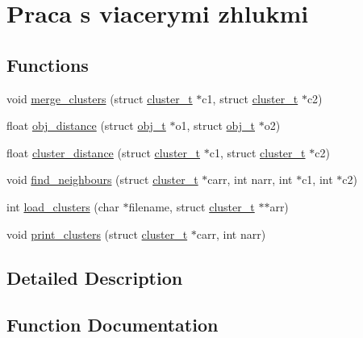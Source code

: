 \hypertarget{group__clusts}{}\section{Praca s viacerymi zhlukmi}
\label{group__clusts}
\subsection*{Functions}
\begin{DoxyCompactItemize}
\item 
void \hyperlink{group__clusts_gac39a25fdec1f4952ec92ee5407893158}{merge\+\_\+clusters} (struct \hyperlink{structcluster__t}{cluster\+\_\+t} $\ast$c1, struct \hyperlink{structcluster__t}{cluster\+\_\+t} $\ast$c2)
\end{DoxyCompactItemize}
\begin{DoxyCompactItemize}
\item 
float \hyperlink{group__clusts_ga703ce6afddf65026b68645bc5394405b}{obj\+\_\+distance} (struct \hyperlink{structobj__t}{obj\+\_\+t} $\ast$o1, struct \hyperlink{structobj__t}{obj\+\_\+t} $\ast$o2)
\item 
float \hyperlink{group__clusts_gaf336f28a62c28da792f6def84f432bb2}{cluster\+\_\+distance} (struct \hyperlink{structcluster__t}{cluster\+\_\+t} $\ast$c1, struct \hyperlink{structcluster__t}{cluster\+\_\+t} $\ast$c2)
\item 
void \hyperlink{group__clusts_ga5f16d682e7c859f7bd3f27697c2b7cc0}{find\+\_\+neighbours} (struct \hyperlink{structcluster__t}{cluster\+\_\+t} $\ast$carr, int narr, int $\ast$c1, int $\ast$c2)
\end{DoxyCompactItemize}
\begin{DoxyCompactItemize}
\item 
int \hyperlink{group__clusts_ga9d928923d43120cb53ddff210a087061}{load\+\_\+clusters} (char $\ast$filename, struct \hyperlink{structcluster__t}{cluster\+\_\+t} $\ast$$\ast$arr)
\item 
void \hyperlink{group__clusts_gad350e6021e5fead00ff2eeec4d134525}{print\+\_\+clusters} (struct \hyperlink{structcluster__t}{cluster\+\_\+t} $\ast$carr, int narr)
\end{DoxyCompactItemize}


\subsection{Detailed Description}


\subsection{Function Documentation}
\mbox{\label{group__clusts_gaf336f28a62c28da792f6def84f432bb2}} 
